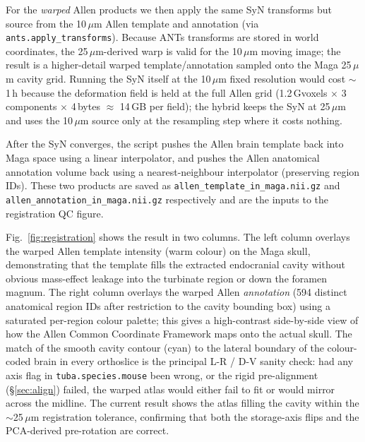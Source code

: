 \documentclass{compactarticle}
\begin{document}
For the \emph{warped} Allen products we then apply the same SyN
transforms but source from the 10\,$\mu$m Allen template and annotation
(via \texttt{ants.apply\_transforms}). Because ANTs transforms are
stored in world coordinates, the 25\,$\mu$m-derived warp is valid for
the 10\,$\mu$m moving image; the result is a higher-detail warped
template/annotation sampled onto the Maga 25\,$\mu$m cavity grid. Running the
SyN itself at the 10\,$\mu$m fixed resolution would cost $\sim$1\,h
because the deformation field is held at the full Allen grid
(1.2\,Gvoxels $\times$ 3 components $\times$ 4\,bytes $\approx$ 14\,GB
per field); the hybrid keeps the SyN at 25\,$\mu$m and uses the 10\,$\mu$m
source only at the resampling step where it costs nothing.

After the SyN converges, the script pushes the Allen brain template
back into Maga space using a linear interpolator, and pushes the
Allen anatomical annotation volume back using a nearest-neighbour
interpolator (preserving region IDs). These two products are saved
as \texttt{allen\_template\_}\allowbreak\texttt{in\_maga.nii.gz} and
\texttt{allen\_annotation\_}\allowbreak\texttt{in\_maga.nii.gz}
respectively and are the inputs to the registration QC figure.

Fig.~\ref{fig:registration} shows the result in two columns. The left
column overlays the warped Allen template intensity (warm colour) on
the Maga skull, demonstrating that the template fills the extracted
endocranial cavity without obvious mass-effect leakage into the
turbinate region or down the foramen magnum. The right column
overlays the warped Allen \emph{annotation} (594 distinct anatomical
region IDs after restriction to the cavity bounding box) using a
saturated per-region colour palette; this gives a high-contrast
side-by-side view of how the Allen Common Coordinate Framework maps
onto the actual skull. The match of the smooth cavity contour (cyan)
to the lateral boundary of the colour-coded brain in every orthoslice
is the principal L-R / D-V sanity check: had any axis flag in
\texttt{tuba.species.mouse} been wrong, or the rigid
pre-alignment (\S\ref{sec:align}) failed, the warped atlas would
either fail to fit or would mirror across the midline. The current
result shows the atlas filling the cavity within the $\sim$25\,$\mu$m
registration tolerance, confirming that both the storage-axis flips
and the PCA-derived pre-rotation are correct.
\end{document}
